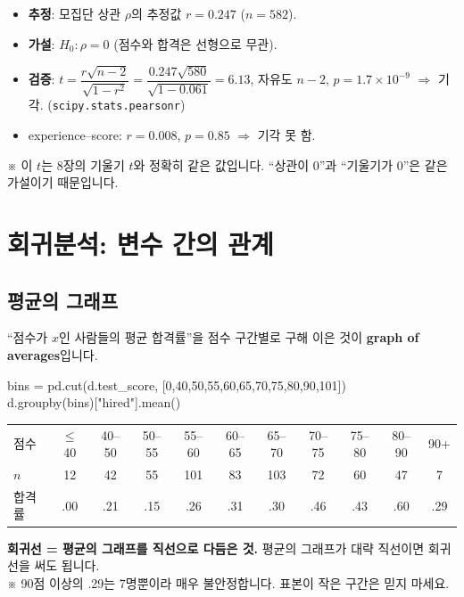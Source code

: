 \documentclass[11pt,a4paper]{article}
\newcommand{\term}[1]{\textbf{#1}}
\newcommand{\code}[1]{\texttt{#1}}
\newcommand{\aside}[1]{{\footnotesize\color{black!65}#1}}
\begin{document}
\begin{hypbox}
\begin{itemize}
\item \textbf{추정}: 모집단 상관 $\rho$의 추정값 $r=0.247$ ($n=582$).
\item \textbf{가설}: $H_0:\rho=0$ (점수와 합격은 선형으로 무관).
\item \textbf{검증}: $t=\dfrac{r\sqrt{n-2}}{\sqrt{1-r^2}}=\dfrac{0.247\sqrt{580}}{\sqrt{1-0.061}}=6.13$, 자유도 $n-2$, $p=1.7\times10^{-9}$ $\Rightarrow$ 기각. (\code{scipy.stats.pearsonr})
\item experience–score: $r=0.008$, $p=0.85$ $\Rightarrow$ 기각 못 함.
\end{itemize}
\aside{※ 이 $t$는 8장의 기울기 $t$와 정확히 같은 값입니다. ``상관이 0''과 ``기울기가 0''은 같은 가설이기 때문입니다.}
\end{hypbox}

\section{회귀분석: 변수 간의 관계}

\subsection{평균의 그래프}
``점수가 $x$인 사람들의 평균 합격률''을 점수 구간별로 구해 이은 것이 \term{graph of averages}입니다.
\begin{codebox}
bins = pd.cut(d.test\_score, [0,40,50,55,60,65,70,75,80,90,101])\\
d.groupby(bins)["hired"].mean()
\end{codebox}
\begin{center}
\begin{tabular}{@{}l *{10}{c}@{}}
\toprule
점수 & $\le$40 & 40–50 & 50–55 & 55–60 & 60–65 & 65–70 & 70–75 & 75–80 & 80–90 & 90+ \\
$n$ & 12 & 42 & 55 & 101 & 83 & 103 & 72 & 60 & 47 & 7 \\
합격률 & .00 & .21 & .15 & .26 & .31 & .30 & .46 & .43 & .60 & .29 \\
\bottomrule
\end{tabular}
\end{center}
\textbf{회귀선 = 평균의 그래프를 직선으로 다듬은 것.} 평균의 그래프가 대략 직선이면 회귀선을 써도 됩니다.\\
\aside{※ 90점 이상의 .29는 7명뿐이라 매우 불안정합니다. 표본이 작은 구간은 믿지 마세요.}
\end{document}
